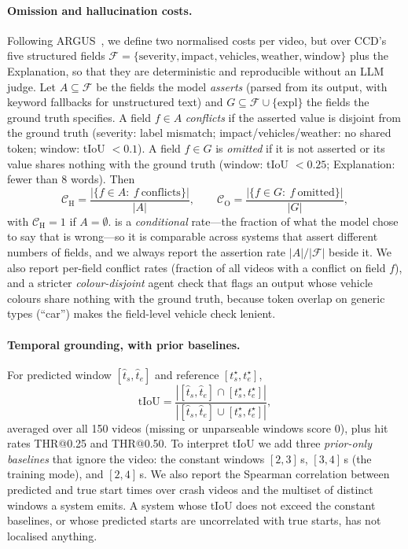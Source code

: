 \paragraph{Omission and hallucination costs.}
\label{sec:metrics-ho}
Following ARGUS~\cite{argus2025}, we define two normalised costs per video, but over CCD's five structured fields $\mathcal{F}=\{\text{severity},\text{impact},\text{vehicles},\text{weather},\text{window}\}$ plus the Explanation, so that they are deterministic and reproducible without an LLM judge.
Let $A\subseteq\mathcal{F}$ be the fields the model \emph{asserts} (parsed from its output, with keyword fallbacks for unstructured text) and $G\subseteq\mathcal{F}\cup\{\text{expl}\}$ the fields the ground truth specifies.
A field $f\in A$ \emph{conflicts} if the asserted value is disjoint from the ground truth (severity: label mismatch; impact/vehicles/weather: no shared token; window: tIoU $<0.1$).
A field $f\in G$ is \emph{omitted} if it is not asserted or its value shares nothing with the ground truth (window: tIoU $<0.25$; Explanation: fewer than 8 words).
Then
\begin{equation}
\mathcal{C}_{\mathrm{H}}=\frac{|\{f\in A:\ f\ \text{conflicts}\}|}{|A|},\qquad
\mathcal{C}_{\mathrm{O}}=\frac{|\{f\in G:\ f\ \text{omitted}\}|}{|G|},
\label{eq:ho}
\end{equation}
with $\mathcal{C}_{\mathrm{H}}{=}1$ if $A{=}\emptyset$.
\Hcost{} is a \emph{conditional} rate---the fraction of what the model chose to say that is wrong---so it is comparable across systems that assert different numbers of fields, and we always report the assertion rate $|A|/|\mathcal{F}|$ beside it.
We also report per-field conflict rates (fraction of all videos with a conflict on field $f$), and a stricter \emph{colour-disjoint} agent check that flags an output whose vehicle colours share nothing with the ground truth, because token overlap on generic types (``car'') makes the field-level vehicle check lenient.

\paragraph{Temporal grounding, with prior baselines.}
\label{sec:metrics-temporal}
For predicted window $[\hat t_s,\hat t_e]$ and reference $[t_s^\star,t_e^\star]$,
\begin{equation}
\mathrm{tIoU}=\frac{|[\hat t_s,\hat t_e]\cap[t_s^\star,t_e^\star]|}{|[\hat t_s,\hat t_e]\cup[t_s^\star,t_e^\star]|},
\label{eq:tiou}
\end{equation}
averaged over all 150 videos (missing or unparseable windows score 0), plus hit rates THR@0.25 and THR@0.50.
To interpret tIoU we add three \emph{prior-only baselines} that ignore the video: the constant windows $[2,3]$\,s, $[3,4]$\,s (the training mode), and $[2,4]$\,s.
We also report the Spearman correlation between predicted and true start times over crash videos and the multiset of distinct windows a system emits.
A system whose tIoU does not exceed the constant baselines, or whose predicted starts are uncorrelated with true starts, has not localised anything.

